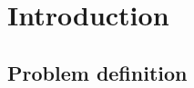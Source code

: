 \chapter{Introduction}\label{ch:introduction}


\section{Problem definition}\label{sec:problem-definition}

